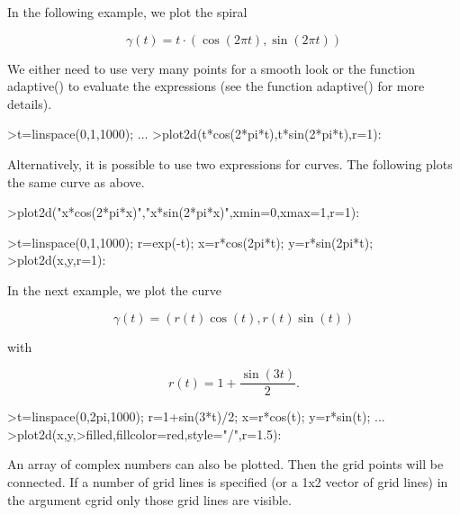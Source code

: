 \documentclass{article}
\begin{document}
\begin{eulernotebook}
\begin{eulercomment}
\begin{eulercomment}
\begin{eulercomment}
\begin{eulercomment}
\begin{eulercomment}
\begin{eulercomment}
\begin{eulercomment}
In the following example, we plot the spiral

\end{eulercomment}
\begin{eulerformula}
\[
\gamma(t) = t \cdot (\cos(2\pi t),\sin(2\pi t))
\]
\end{eulerformula}
\begin{eulercomment}
We either need to use very many points for a smooth look or the function adaptive() to
evaluate the expressions (see the function adaptive() for more details).
\end{eulercomment}
\begin{eulerprompt}
>t=linspace(0,1,1000); ...
>plot2d(t*cos(2*pi*t),t*sin(2*pi*t),r=1):
\end{eulerprompt}
\begin{eulercomment}
Alternatively, it is possible to use two expressions for curves. The
following plots the same curve as above.
\end{eulercomment}
\begin{eulerprompt}
>plot2d("x*cos(2*pi*x)","x*sin(2*pi*x)",xmin=0,xmax=1,r=1):
\end{eulerprompt}
\begin{eulerprompt}
>t=linspace(0,1,1000); r=exp(-t); x=r*cos(2pi*t); y=r*sin(2pi*t);
>plot2d(x,y,r=1):
\end{eulerprompt}
\begin{eulercomment}
In the next example, we plot the curve

\end{eulercomment}
\begin{eulerformula}
\[
\gamma(t) = (r(t) \cos(t), r(t) \sin(t))
\]
\end{eulerformula}
\begin{eulercomment}
with

\end{eulercomment}
\begin{eulerformula}
\[
r(t) = 1 + \dfrac{\sin(3t)}{2}.
\]
\end{eulerformula}
\begin{eulerprompt}
>t=linspace(0,2pi,1000); r=1+sin(3*t)/2; x=r*cos(t); y=r*sin(t); ...
>plot2d(x,y,>filled,fillcolor=red,style="/",r=1.5):
\end{eulerprompt}
\begin{eulercomment}
An array of complex numbers can also be plotted. Then the grid points will be
connected. If a number of grid lines is specified (or a 1x2 vector of grid lines) in
the argument cgrid only those grid lines are visible.


\end{eulercomment}
\end{eulercomment}
\end{eulercomment}
\end{eulercomment}
\end{eulercomment}
\end{eulercomment}
\end{eulercomment}
\end{eulernotebook}
\end{document}
